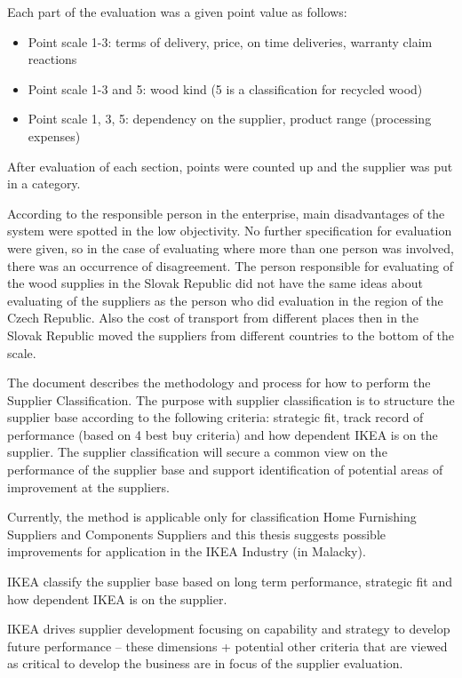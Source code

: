 \documentclass[oneside,12pt]{article}%
\begin{document}

Each part of the evaluation was a given point value as follows:

\begin{itemize}
  \item Point scale 1-3: terms of delivery, price, on time deliveries, warranty claim reactions
  \item Point scale 1-3 and 5: wood kind (5 is a classification for recycled wood)
  \item Point scale 1, 3, 5:  dependency on the supplier, product range (processing expenses)
\end{itemize}

After evaluation of each section, points were counted up and the supplier was put in a category.

According to the responsible person in the enterprise, main disadvantages of the system were spotted in the low objectivity. No further specification for evaluation were given, so in the case of evaluating where more than one person was involved, there was an occurrence of disagreement. The person responsible for evaluating of the wood supplies in the Slovak Republic did not have the same ideas about evaluating of the suppliers as the person who did evaluation in the region of the Czech Republic. Also the cost of transport from different places then in the Slovak Republic moved the suppliers from different countries to the bottom of the scale.

The document describes the methodology and process for how to perform the Supplier Classification. The purpose with supplier classification is to structure the supplier base according to the following criteria: strategic fit, track record of performance (based on 4 best buy criteria) and how dependent IKEA is on the supplier. The supplier classification will secure a common view on the performance of the supplier base and support identification of potential areas of improvement at the suppliers. \par
Currently, the method is applicable only for classification Home Furnishing Suppliers and Components Suppliers and this thesis suggests possible improvements for application in the IKEA Industry (in Malacky).\par
IKEA classify the supplier base based on long term performance, strategic fit and how dependent IKEA is on the supplier. \par
IKEA drives supplier development focusing on capability and strategy to develop future performance – these dimensions + potential other criteria that are viewed as critical to develop the business are in focus of the supplier evaluation.
\end{document}
